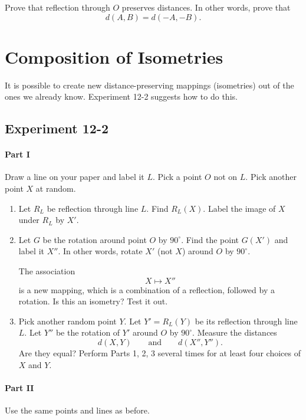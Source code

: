 \documentclass[12pt]{book} %
\begin{document}
\begin{ExerciseList}
\begin{ExerciseList}
\Exercise Prove that reflection through $O$ preserves distances. In other words, prove that
\[
d(A,B)=d(-A,-B).
\]
\end{ExerciseList}

\section{Composition of Isometries}

It is possible to create new distance-preserving mappings (isometries) out of the ones we already know. Experiment 12-2 suggests how to do this.

\subsection*{Experiment 12-2}

\paragraph{Part I}
Draw a line on your paper and label it $L$. Pick a point $O$ not on $L$. Pick another point $X$ at random.

\begin{enumerate}
\item Let $R_L$ be reflection through line $L$. Find $R_L(X)$. Label the image of $X$ under $R_L$ by $X'$.

\item Let $G$ be the rotation around point $O$ by $90^\circ$. Find the point $G(X')$ and label it $X''$. In other words, rotate $X'$ (not $X$) around $O$ by $90^\circ$.

The association
\[
X\longmapsto X''
\]
is a new mapping, which is a combination of a reflection, followed by a rotation. Is this an isometry? Test it out.

\item Pick another random point $Y$. Let $Y'=R_L(Y)$ be its reflection through line $L$. Let $Y''$ be the rotation of $Y'$ around $O$ by $90^\circ$. Measure the distances
\[
d(X,Y)\qquad \text{and} \qquad d(X'',Y'').
\]
Are they equal? Perform Parts 1, 2, 3 several times for at least four choices of $X$ and $Y$.
\end{enumerate}

\paragraph{Part II}
Use the same points and lines as before.


\end{ExerciseList}
\end{document}

